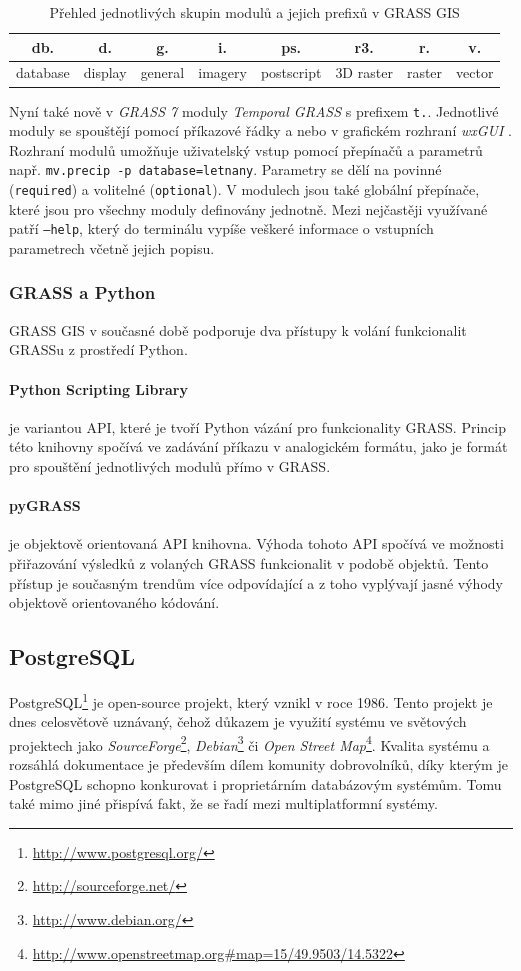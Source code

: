 \documentclass[a4paper,12pt]{report}
\begin{document}
\begin{table}[h]
\centering
\begin{tabular}{|cccccccc|}
\hline
db. & d. & g. & i. & ps. & r3. & r. & v. \\
\hline \hline
database & display & general & imagery & postscript & 3D raster & raster & vector \\ \hline
\end{tabular}
\caption{Přehled jednotlivých skupin modulů a jejich prefixů v GRASS GIS}
\label{tab:module}
\end{table}


Nyní také nově v \textit{GRASS 7} moduly \textit{Temporal GRASS} s prefixem \texttt{t.}. Jednotlivé moduly se spouštějí pomocí příkazové řádky a nebo v grafickém rozhraní \textit{wxGUI} . Rozhraní modulů umožňuje uživatelský vstup pomocí přepínačů a parametrů např. \texttt{mv.precip -p database=letnany}. Parametry se dělí na povinné (\texttt{required}) a volitelné (\texttt{optional}). V modulech jsou také globální přepínače, které jsou pro všechny moduly definovány jednotně. Mezi nejčastěji využívané patří \texttt{--help}, který do terminálu vypíše veškeré informace o vstupních parametrech včetně jejich  popisu.

\subsubsection*{GRASS a Python}
GRASS GIS v současné době podporuje dva přístupy k volání funkcionalit GRASSu z prostředí Python.
\paragraph*{Python Scripting Library} je variantou API, které je tvoří Python vázání pro funkcionality GRASS. Princip této knihovny spočívá ve zadávání příkazu v analogickém formátu, jako je formát pro spouštění jednotlivých modulů přímo v GRASS.
\paragraph*{pyGRASS} je objektově orientovaná API knihovna. Výhoda tohoto API spočívá ve možnosti přiřazování výsledků z volaných GRASS funkcionalit v podobě objektů. Tento přístup je současným trendům více odpovídající a z toho vyplývají jasné výhody objektově orientovaného kódování.

\subsection{PostgreSQL}
PostgreSQL\footnote{\url{http://www.postgresql.org/}} je open-source projekt, který vznikl v roce 1986. Tento projekt je dnes celosvětově uznávaný, čehož důkazem je využití systému ve světových projektech jako \textit{SourceForge}\footnote{\url{http://sourceforge.net/}}, \textit{Debian}\footnote{\url{http://www.debian.org/}} či \textit{Open Street Map}\footnote{\url{http://www.openstreetmap.org\#map=15/49.9503/14.5322}}. Kvalita systému a rozsáhlá dokumentace je především dílem komunity dobrovolníků, díky kterým je PostgreSQL schopno konkurovat i proprietárním databázovým systémům. Tomu také mimo jiné přispívá fakt, že se řadí mezi multiplatformní systémy.\cite{postgre}
\end{document}
